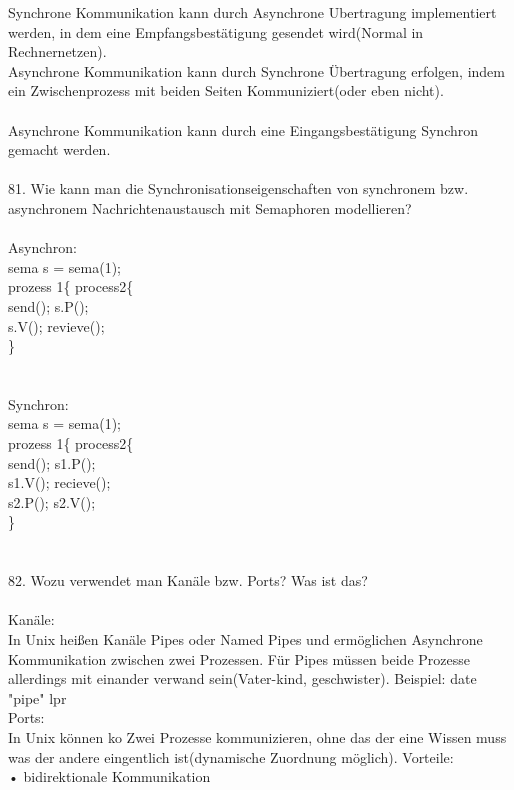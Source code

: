 \documentclass{article}
\newcommand\tab[1][1cm]{\hspace*{#1}}
\begin{document}
Synchrone Kommunikation kann durch Asynchrone Ubertragung implementiert werden, in dem eine Empfangsbest\"atigung gesendet wird(Normal in Rechnernetzen).\\
Asynchrone Kommunikation kann durch Synchrone \"Ubertragung erfolgen, indem ein Zwischenprozess mit beiden Seiten Kommuniziert(oder eben nicht).
\\
\\
Asynchrone Kommunikation kann durch eine Eingangsbest\"atigung Synchron gemacht werden.
\\
\\
81. Wie kann man die Synchronisationseigenschaften von synchronem bzw. asynchronem
Nachrichtenaustausch mit Semaphoren modellieren?
\\
\\
Asynchron:\\
sema s = sema(1);\\
\tab prozess 1\{ \tab process2\{\\
\tab send();  \tab s.P();\\
\tab s.V();   \tab revieve();\\
\}\\
\\
\\
Synchron:\\
sema s = sema(1);\\
\tab prozess 1\{ \tab process2\{\\
\tab send();    \tab s1.P();\\
\tab s1.V();    \tab recieve();\\
\tab s2.P();    \tab s2.V();\\
\}\\
\\
\\
82. Wozu verwendet man Kanäle bzw. Ports? Was ist das?
\\
\\
Kan\"ale:\\
In Unix hei\ss en Kan\"ale Pipes oder Named Pipes und erm\"oglichen Asynchrone Kommunikation zwischen zwei Prozessen. F\"ur Pipes m\"ussen beide Prozesse allerdings mit einander verwand sein(Vater-kind, geschwister). Beispiel: date "pipe" lpr\\
Ports:\\
In Unix k\"onnen ko Zwei Prozesse kommunizieren, ohne das der eine Wissen muss was der andere eingentlich ist(dynamische Zuordnung m\"oglich).
Vorteile:\\
• bidirektionale Kommunikation\\
\end{document}
